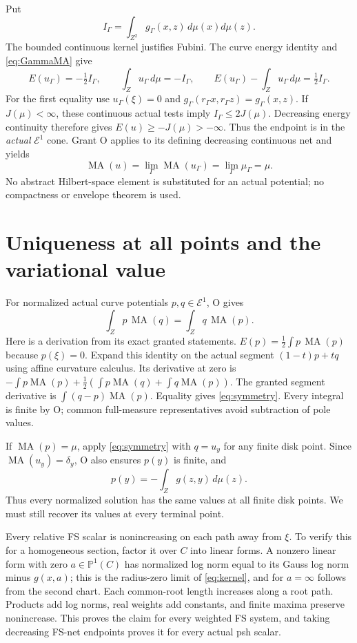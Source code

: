 \documentclass[11pt]{article}
\newcommand{\MA}{\operatorname{MA}}
\newcommand{\E}{\mathcal E}
\begin{document}
Put
\[
 I_\Gamma=\int_{Z^2}g_\Gamma(x,z)\,d\mu(x)d\mu(z).
\]
The bounded continuous kernel justifies Fubini. The curve energy
identity and \eqref{eq:GammaMA} give
\begin{equation}\label{eq:cost}
 E(u_\Gamma)=-\tfrac12 I_\Gamma,\qquad
 \int_Zu_\Gamma\,d\mu=-I_\Gamma,\qquad
 E(u_\Gamma)-\int_Zu_\Gamma\,d\mu=\tfrac12 I_\Gamma.
\end{equation}
For the first equality use $u_\Gamma(\xi)=0$ and
$g_\Gamma(r_\Gamma x,r_\Gamma z)=g_\Gamma(x,z)$.
If $J(\mu)<\infty$, these continuous actual tests imply
$I_\Gamma\leq2J(\mu)$. Decreasing energy continuity therefore
gives $E(u)\geq-J(\mu)>-\infty$. Thus the endpoint is in the
\emph{actual} $\E^1$ cone. Grant O applies to its defining
decreasing continuous net and yields
\[
 \MA(u)=\lim_\Gamma\MA(u_\Gamma)
             =\lim_\Gamma\mu_\Gamma=\mu.
\]
No abstract Hilbert-space element is substituted for an actual
potential; no compactness or envelope theorem is used.

\section{Uniqueness at all points and the variational value}

For normalized actual curve potentials $p,q\in\E^1$, O gives
\begin{equation}\label{eq:symmetry}
                     \int_Zp\,\MA(q)=\int_Zq\,\MA(p).
\end{equation}
Here is a derivation from its exact granted statements.
$E(p)=\frac12\int p\,\MA(p)$ because $p(\xi)=0$.
Expand this identity on the actual segment $(1-t)p+tq$ using
affine curvature calculus. Its derivative at zero is
$-\int p\MA(p)+\frac12(\int p\MA(q)+\int q\MA(p))$.
The granted segment derivative is
$\int(q-p)\MA(p)$. Equality gives \eqref{eq:symmetry}.
Every integral is finite by O; common full-measure representatives
avoid subtraction of pole values.

If $\MA(p)=\mu$, apply \eqref{eq:symmetry} with $q=u_y$ for
any finite disk point. Since $\MA(u_y)=\delta_y$, O also
ensures $p(y)$ is finite, and
\begin{equation}\label{eq:values}
                         p(y)=-\int_Zg(z,y)\,d\mu(z).
\end{equation}
Thus every normalized solution has the same values at all finite
disk points. We must still recover its values at every terminal
point.

Every relative FS scalar is nonincreasing on each path away
from $\xi$. To verify this for a homogeneous section, factor
it over $C$ into linear forms. A nonzero linear form with zero
$a\in\mathbb P^1(C)$ has normalized log norm equal to its
Gauss log norm minus $g(x,a)$; this is the radius-zero limit
of \eqref{eq:kernel}, and for $a=\infty$ follows from the
second chart. Each common-root length increases along a
root path. Products add log norms, real weights add constants,
and finite maxima preserve nonincrease. This proves the claim
for every weighted FS system, and taking decreasing FS-net
endpoints proves it for every actual psh scalar.
\end{document}
